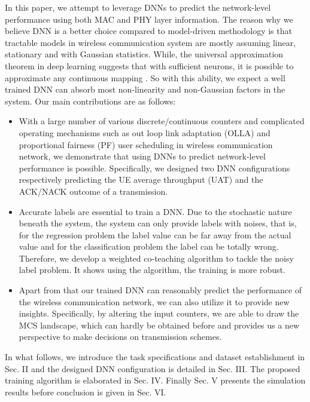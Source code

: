 \documentclass[journal]{IEEEtran}
\begin{document}
	In this paper, we attempt to leverage DNNs to predict the network-level performance using both MAC and PHY layer information. The reason why we believe DNN is a better choice compared to model-driven methodology is that tractable models in wireless communication system are mostly assuming linear, stationary and with Gaussian statistics. While, the universal approximation theorem in deep learning suggests that with sufficient neurons, it is possible to approximate any continuous mapping \cite{marsland2014machine}. So with this ability, we expect a well trained DNN can absorb most  non-linearity and non-Gaussian factors in the system. Our main contributions are as follows:
	\begin{itemize}
		\item With a large number of various discrete/continuous counters and complicated operating mechanisms such as out loop link adaptation (OLLA) and proportional fairness (PF) user scheduling in wireless communication network, we demonstrate that using DNNs to predict network-level performance is possible. Specifically, we designed two DNN configurations respectively predicting the UE average throughput (UAT) and the ACK/NACK outcome of a transmission.
		\item Accurate labels are essential to train a DNN. Due to the stochastic nature beneath the system, the system can only provide labels with noises, that is, for the regression problem the label value can be far away from the actual value and for the classification problem the label can be totally wrong. Therefore, we develop a weighted co-teaching algorithm to tackle the noisy label problem. It shows using the algorithm, the training is more robust.
		\item Apart from that our trained DNN can reasonably predict the performance of the wireless communication network, we can also utilize it to provide new insights. Specifically, by altering the input counters, we are able to draw the MCS landscape, which can hardly be obtained before and provides us a new perspective to make decisions on transmission schemes.
	\end{itemize}
	

	
	In what follows, we introduce the task specifications and dataset establishment in Sec. II and the designed DNN configuration is detailed in Sec. III. The proposed training algorithm is elaborated in Sec. IV. Finally Sec. V presents the simulation results before conclusion is given in Sec. VI.
		
\end{document}
